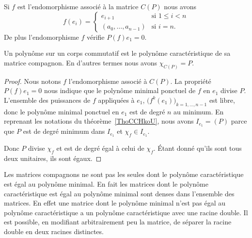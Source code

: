 \begin{proposition}     \label{PROPooNDCLooYMGHmX}
	Si \( f\) est l'endomorphisme associé à la matrice \( C(P)\) nous avons
	\begin{equation}
		f(e_i)=\begin{cases}
			e_{i+1}               & \text{si } 1\leq i<n \\
			(a_0,\ldots, a_{n-1}) & \text{si } i=n.
		\end{cases}
	\end{equation}
	De plus l'endomorphisme \( f\) vérifie \( P(f)e_1=0\).
\end{proposition}

\begin{lemma} \label{LemkVNisk}
	Un polynôme sur un corps commutatif est le polynôme caractéristique de sa matrice compagnon. En d'autres termes nous avons \( \chi_{C(P)}=P\).
\end{lemma}

\begin{proof}
	Nous notons \( f\) l'endomorphisme associé à \( C(P)\). La propriété \( P(f)e_1=0\) nous indique que le polynôme minimal ponctuel de \( f\) en \( e_1\) divise \( P\). L'ensemble des puissances de \( f\) appliquées à \( e_1\), \( \big( f^k(e_1) \big)_{k=1,\ldots, n-1}\) est libre, donc le polynôme minimal ponctuel en \( e_1\) est de degré \( n\) au minimum. En reprenant les notations du théorème~\ref{ThoCCHkoU}, nous avons \( I_{e_1}=(P)\) parce que \( P\) est de degré minimum dans \( I_{e_1}\) et \( \chi_f\in I_{e_1}\).

	Donc \( P\) divise \( \chi_f\) et est de degré égal à celui de \( \chi_f\). Étant donné qu'ils sont tous deux unitaires, ils sont égaux.
\end{proof}

\begin{remark}  \label{RemmQjZOA}
	Les matrices compagnons ne sont pas les seules dont le polynôme caractéristique est égal au polynôme minimal. En fait les matrices dont le polynôme caractéristique est égal au polynôme minimal sont denses dans l'ensemble des matrices. En effet une matrice dont le polynôme minimal n'est pas égal au polynôme caractéristique a un polynôme caractéristique avec une racine double. Il est possible, en modifiant arbitrairement peu la matrice, de séparer la racine double en deux racines distinctes.
\end{remark}

